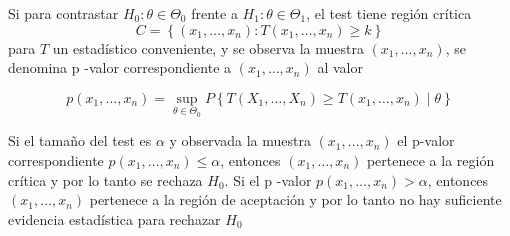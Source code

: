 \begin{definición} [p-valor]
 Si para contrastar $H_{0}: \theta \in \Theta_{0}$ frente a $H_{1}: \theta \in \Theta_{1}$, el test tiene región crítica 
 $$C=\left\{\left(x_{1}, \ldots, x_{n}\right): T\left(x_{1}, \ldots, x_{n}\right) \geq k\right\}$$
 para $T$ un estadístico conveniente, y se observa la muestra $\left(x_{1}, \ldots, x_{n}\right)$, se denomina p -valor correspondiente a $\left(x_{1}, \ldots, x_{n}\right)$ al valor

$$
p\left(x_{1}, \ldots, x_{n}\right)=\sup _{\theta \in \Theta_{0}} P\left\{T\left(X_{1}, \ldots, X_{n}\right) \geq T\left(x_{1}, \ldots, x_{n}\right) \mid \theta\right\}
$$

Si el tamaño del test es $\alpha$ y observada la muestra $\left(x_{1}, \ldots, x_{n}\right)$ el p-valor correspondiente $p\left(x_{1}, \ldots, x_{n}\right) \leq \alpha$, entonces $\left(x_{1}, \ldots, x_{n}\right)$ pertenece a la región crítica y por lo tanto se rechaza $H_{0}$. Si el p -valor $p\left(x_{1}, \ldots, x_{n}\right)>\alpha$, entonces $\left(x_{1}, \ldots, x_{n}\right)$ pertenece a la región de aceptación y por lo tanto no hay suficiente evidencia estadística para rechazar $H_{0}$
\end{definición}




